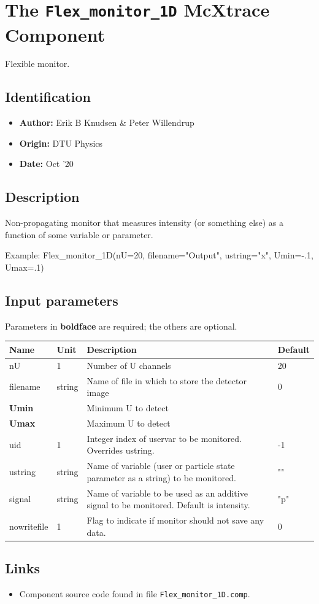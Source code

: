 \section{The \texttt{Flex\_monitor\_1D} McXtrace Component}
Flexible monitor.

\subsection*{Identification}
\begin{itemize}
  \item \textbf{Author:} Erik B Knudsen \& Peter Willendrup
  \item \textbf{Origin:} DTU Physics
  \item \textbf{Date:} Oct '20
\end{itemize}

\subsection*{Description}
Non-propagating monitor that measures intensity (or something else) as a function of some variable or parameter.

Example: Flex\_monitor\_1D(nU=20, filename="Output", ustring="x", Umin=-.1, Umax=.1)

\subsection*{Input parameters}
Parameters in \textbf{boldface} are required; the others are optional.

\begin{longtable}{p{}p{}p{}p{}}
\toprule
\textbf{Name} & \textbf{Unit} & \textbf{Description} & \textbf{Default} \\
\midrule
\endhead
nU & 1 & Number of U channels & 20 \\
filename & string & Name of file in which to store the detector image & 0 \\
\textbf{Umin} &  & Minimum U to detect &  \\
\textbf{Umax} &  & Maximum U to detect &  \\
uid & 1 & Integer index of uservar to be monitored. Overrides ustring. & -1 \\
ustring & string & Name of variable (user or particle state parameter as a string) to be monitored. & "" \\
signal & string & Name of variable to be used as an additive signal to be monitored. Default is intensity. & "p" \\
nowritefile & 1 & Flag to indicate if monitor should not save any data. & 0 \\
\bottomrule
\end{longtable}

\subsection*{Links}
\begin{itemize}
  \item Component source code found in file \texttt{Flex\_monitor\_1D.comp}.
\end{itemize}
